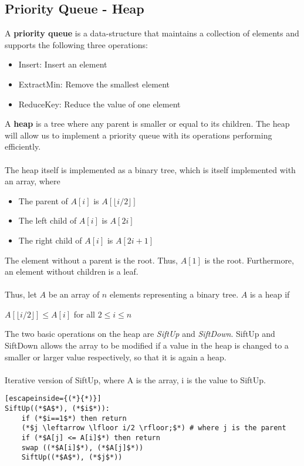 \documentclass[a4paper]{article}
\begin{document}
\subsection{Priority Queue - Heap}
A \textbf{priority queue} is a data-structure that maintains a collection of elements and supports the following three operations:
\begin{itemize}
	\item Insert: Insert an element
	\item ExtractMin: Remove the smallest element
	\item ReduceKey: Reduce the value of one element
\end{itemize}
A \textbf{heap} is a tree where any parent is smaller or equal to its children. The heap will allow us to implement a priority queue with its operations performing efficiently.\\ \\
The heap itself is implemented as a binary tree, which is itself implemented with an array, where
\begin{itemize}
	\item The parent of $A[i]$ is $A[\lfloor i/2 \rfloor]$
	\item The left child of $A[i]$ is $A[2i]$
	\item The right child of $A[i]$  is $A[2i + 1]$
\end{itemize}
The element without a parent is the root. Thus, $A[1]$ is the root. Furthermore, an element without children is a leaf.\\ \\
Thus, let $A$ be an array of $n$ elements representing a binary tree. $A$ is a heap if
\begin{center}
	$A[\lfloor i/2 \rfloor] \le A[i]$ for all $2 \le i \le n$
\end{center}
The two basic operations on the heap are \textit{SiftUp} and \textit{SiftDown}. SiftUp and SiftDown allows the array to be modified if a value in the heap is changed to a smaller or larger value respectively, so that it is again a heap.\\ \\
Iterative version of SiftUp, where A is the array, i is the value to SiftUp.
\begin{lstlisting}[escapeinside={(*}{*)}]
SiftUp((*$A$*), (*$i$*)):
	if (*$i==1$*) then return
	(*$j \leftarrow \lfloor i/2 \rfloor;$*) # where j is the parent
	if (*$A[j] <= A[i]$*) then return
	swap ((*$A[i]$*), (*$A[j]$*))
	SiftUp((*$A$*), (*$j$*))
\end{lstlisting}
\end{document}

